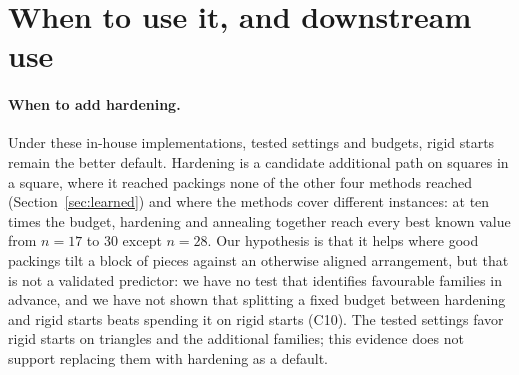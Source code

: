 \section{When to use it, and downstream use}\label{sec:matters}
\paragraph{When to add hardening.} Under these in-house implementations, tested settings and budgets, rigid starts remain the better default. Hardening is a candidate additional path on squares in a square, where it reached packings none of the other four methods reached (Section~\ref{sec:learned}) and where the methods cover different instances: at ten times the budget, hardening and annealing together reach every best known value from $n=17$ to 30 except $n=28$. Our hypothesis is that it helps where good packings tilt a block of pieces against an otherwise aligned arrangement, but that is not a validated predictor: we have no test that identifies favourable families in advance, and we have not shown that splitting a fixed budget between hardening and rigid starts beats spending it on rigid starts (C10). The tested settings favor rigid starts on triangles and the additional families; this evidence does not support replacing them with hardening as a default.

